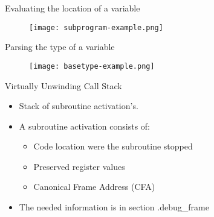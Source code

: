 
\begin{frame}{Evaluating the location of a variable}
	\begin{figure}
		\texttt{[image: subprogram-example.png]}
	\end{figure}
\end{frame}


\begin{frame}{Parsing the type of a variable}
	\begin{figure}
		\texttt{[image: basetype-example.png]}
	\end{figure}
\end{frame}


\begin{frame}{Virtually Unwinding Call Stack}
    \begin{itemize}
        \item Stack of subroutine activation's.
        \item A subroutine activation consists of:
    	\begin{itemize}
    	    \item Code location were the subroutine stopped
    	    \item Preserved register values
	    \item Canonical Frame Address (CFA)
    	\end{itemize}
        \item The needed information is in section .debug\_frame
    \end{itemize}
\end{frame}


